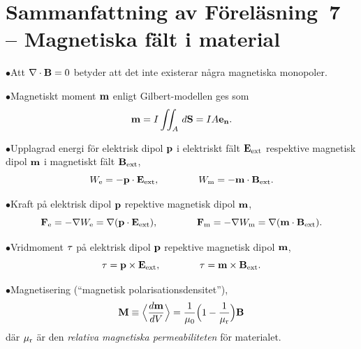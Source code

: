 {{{{{\section{Sammanfattning av F{\"o}rel{\"a}sning~7
  -- Magnetiska f{\"a}lt i material}
\item{$\bullet$}{Att $\nabla\cdot{\bf B}=0$ betyder att det inte existerar
  n{\aa}gra magnetiska monopoler.}
\item{$\bullet$}{Magnetiskt moment ${\bf m}$ enligt Gilbert-modellen ges som
$$
{\bf m}=I\iint_A\,d{\bf S}=IA{\bf e}_{\bf n}.
$$}
\item{$\bullet$}{Upplagrad energi f{\"o}r elektrisk dipol ${\bf p}$ i
  elektriskt f{\"a}lt ${\bf E}_{\rm ext}$ respektive magnetisk dipol ${\bf m}$
  i magnetiskt f{\"a}lt ${\bf B}_{\rm ext}$,
  $$
    W_{\rm e} = -{\bf p}\cdot{\bf E}_{\rm ext},\qquad\qquad
    W_{\rm m} = -{\bf m}\cdot{\bf B}_{\rm ext}.
  $$}
\item{$\bullet$}{Kraft p{\aa} elektrisk dipol ${\bf p}$ repektive magnetisk
  dipol ${\bf m}$,
  $$
    {\bf F}_{\rm e} = -\nabla W_{\rm e}
      =\nabla({\bf p}\cdot{\bf E}_{\rm ext}),\qquad\qquad
    {\bf F}_{\rm m} = -\nabla W_{\rm m}
      =\nabla({\bf m}\cdot{\bf B}_{\rm ext}).
  $$}
\item{$\bullet$}{Vridmoment ${\bf\tau}$ p{\aa} elektrisk dipol ${\bf p}$
  repektive magnetisk dipol ${\bf m}$,
  $$
    {\bf \tau}={\bf p}\times{\bf E}_{\rm ext},\qquad\qquad
    {\bf \tau}={\bf m}\times{\bf B}_{\rm ext}.
  $$}
\item{$\bullet$}{Magnetisering (``magnetisk polarisationsdensitet''),
  $$
    {\bf M} \equiv \Big\langle{{d{\bf m}}\over{dV}}\Big\rangle
      = {{1}\over{\mu_0}}\Big(1-{{1}\over{\mu_{\rm r}}}\Big){\bf B}
  $$
  d{\"a}r $\mu_{\rm r}$ {\"a}r den {\it relativa magnetiska permeabiliteten}
  f{\"o}r materialet.}

}}}}}

